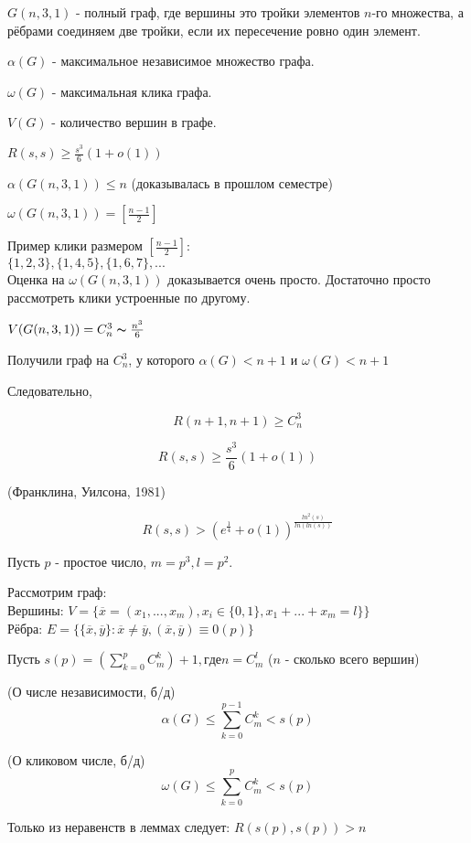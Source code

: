 $G(n, 3, 1)$ - полный граф, где вершины это тройки элементов $n$-го множества, а рёбрами соединяем две тройки, если их пересечение ровно один элемент.

$\alpha (G)$ - максимальное независимое множество графа.

$\omega (G)$ - максимальная клика графа.

$V(G)$ - количество вершин в графе.

\Statement $R(s, s) \geqslant \frac{s^3}{6} (1 + o(1))$

\Proof $\alpha (G(n, 3, 1)) \leqslant n$ (доказывалась в прошлом семестре)

$\omega (G(n, 3, 1)) = \left[ \frac{n-1}{2} \right]$

Пример клики размером $\left[ \frac{n-1}{2} \right]$:\\ 
$\{1, 2, 3\}, \{1, 4, 5\}, \{1, 6, 7\}, ...$\\
Оценка на $\omega(G(n, 3, 1))$ доказывается очень просто. Достаточно просто  рассмотреть клики устроенные по другому. 

$V(G(n, 3, 1)) = C_n^3 \thicksim \frac{n^3}{6}$ 

Получили граф на $C_n^3$, у которого $\alpha (G) < n + 1$ и $\omega (G) < n+1$

Следовательно,

$$R(n + 1, n + 1) \geqslant C_n^3$$

$$R(s, s) \geqslant \frac{s^3}{6} (1 + o(1))$$
\EndProof

\Th (Франклина, Уилсона, 1981)

$$R(s, s) > (e^{\frac{1}{4}} + o(1))^{\frac{ln^2(s)}{ln(ln(s))}}$$

\Proof

Пусть $p$ - простое число, $m = p^3,l = p^2$.

Рассмотрим граф:\\
Вершины: $V = \{\overline{x} = (x_1, ..., x_m), x_i \in \{0, 1\}, x_1 + ... + x_m = l \}\}$\\
Рёбра: $E = \{\{\overline{x}, \overline{y}\}: \overline{x} \neq \overline{y}, (\overline{x}, \overline{y}) \equiv 0 (p)\}$

Пусть $s(p) = (\sum_{k=0}^{p} C_m^k) + 1, где n = C_m^l$ ($n$ - сколько всего вершин)

 (О числе независимости, б/д)
$$\alpha(G) \leqslant \sum_{k=0}^{p-1} C_m^k < s(p)$$

 (О кликовом числе, б/д)
$$\omega(G) \leqslant \sum_{k=0}^{p} C_m^k < s(p)$$

Только из неравенств в леммах следует: $R(s(p), s(p)) > n$

